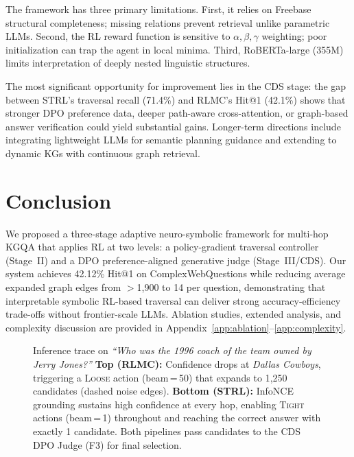 \documentclass[10pt,conference]{IEEEtran}
\begin{document}
The framework has three primary limitations. First, it relies on Freebase structural completeness; missing relations prevent retrieval unlike parametric LLMs. Second, the RL reward function is sensitive to $\alpha,\beta,\gamma$ weighting; poor initialization can trap the agent in local minima. Third, RoBERTa-large (355M) limits interpretation of deeply nested linguistic structures.

The most significant opportunity for improvement lies in the CDS stage: the gap between STRL's traversal recall (71.4\%) and RLMC's Hit@1 (42.1\%) shows that stronger DPO preference data, deeper path-aware cross-attention, or graph-based answer verification could yield substantial gains. Longer-term directions include integrating lightweight LLMs for semantic planning guidance and extending to dynamic KGs with continuous graph retrieval.

\section{Conclusion}

We proposed a three-stage adaptive neuro-symbolic framework for multi-hop KGQA that applies RL at two levels: a policy-gradient traversal controller (Stage~II) and a DPO preference-aligned generative judge (Stage~III/CDS). Our system achieves 42.12\% Hit@1 on ComplexWebQuestions while reducing average expanded graph edges from $>$1,900 to 14 per question, demonstrating that interpretable symbolic RL-based traversal can deliver strong accuracy-efficiency trade-offs without frontier-scale LLMs. Ablation studies, extended analysis, and complexity discussion are provided in Appendix~\ref{app:ablation}--\ref{app:complexity}.




\clearpage


\label{app:working_example}

\begin{figure}[!t]
\centering

\caption{Inference trace on \textit{``Who was the 1996 coach of the team owned by Jerry Jones?''} \textbf{Top (RLMC):} Confidence drops at \textit{Dallas Cowboys}, triggering a \textsc{Loose} action (beam\,=\,50) that expands to 1,250 candidates (dashed noise edges). \textbf{Bottom (STRL):} InfoNCE grounding sustains high confidence at every hop, enabling \textsc{Tight} actions (beam\,=\,1) throughout and reaching the correct answer with exactly 1 candidate. Both pipelines pass candidates to the CDS DPO Judge (F3) for final selection.}
\label{fig:working_example}
\end{figure}
\end{document}
